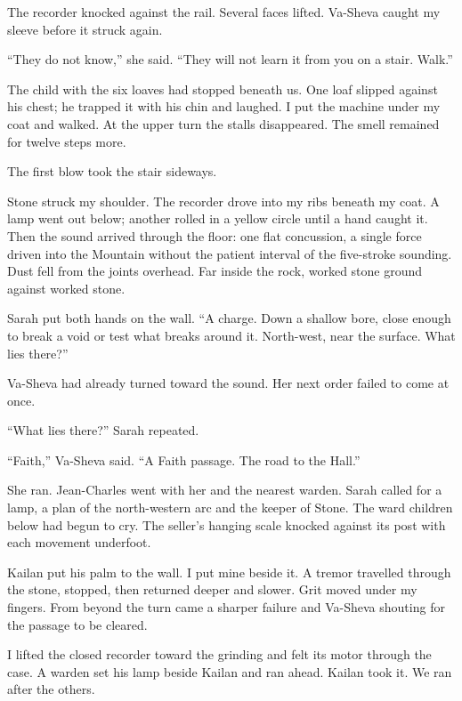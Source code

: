 The recorder knocked against the rail. Several faces lifted. Va-Sheva caught my sleeve before it struck again.\par

``They do not know,'' she said. ``They will not learn it from you on a stair. Walk.''\par

The child with the six loaves had stopped beneath us. One loaf slipped against his chest; he trapped it with his chin and laughed. I put the machine under my coat and walked. At the upper turn the stalls disappeared. The smell remained for twelve steps more.\par

\ornament

The first blow took the stair sideways.\par

Stone struck my shoulder. The recorder drove into my ribs beneath my coat. A lamp went out below; another rolled in a yellow circle until a hand caught it. Then the sound arrived through the floor: one flat concussion, a single force driven into the Mountain without the patient interval of the five-stroke sounding. Dust fell from the joints overhead. Far inside the rock, worked stone ground against worked stone.\par

Sarah put both hands on the wall. ``A charge. Down a shallow bore, close enough to break a void or test what breaks around it. North-west, near the surface. What lies there?''\par

Va-Sheva had already turned toward the sound. Her next order failed to come at once.\par

``What lies there?'' Sarah repeated.\par

``Faith,'' Va-Sheva said. ``A Faith passage. The road to the Hall.''\par

She ran. Jean-Charles went with her and the nearest warden. Sarah called for a lamp, a plan of the north-western arc and the keeper of Stone. The ward children below had begun to cry. The seller's hanging scale knocked against its post with each movement underfoot.\par

Kailan put his palm to the wall. I put mine beside it. A tremor travelled through the stone, stopped, then returned deeper and slower. Grit moved under my fingers. From beyond the turn came a sharper failure and Va-Sheva shouting for the passage to be cleared.\par

I lifted the closed recorder toward the grinding and felt its motor through the case. A warden set his lamp beside Kailan and ran ahead. Kailan took it. We ran after the others.\par
